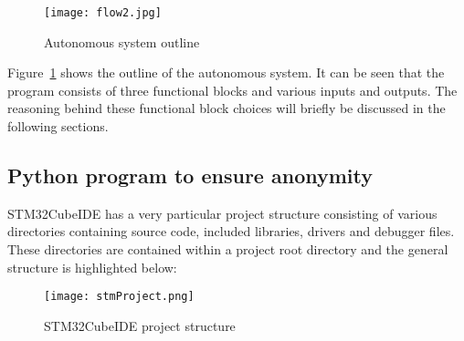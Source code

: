 \begin{figure}[H]
\begin{center}
\texttt{[image: flow2.jpg]}
\caption{Autonomous system outline}
\label{aso}
\end{center}
\end{figure}

Figure~\ref{aso} shows the outline of the autonomous system. It can be seen that the program consists of three functional blocks and various inputs and outputs. The reasoning behind these functional block choices will briefly be discussed in the following sections. 


\subsection{Python program to ensure anonymity}
\label{p1}

STM32CubeIDE has a very particular project structure consisting of various directories containing source code, included libraries, drivers and debugger files. These directories are contained within a project root directory and the general structure is highlighted below:

\begin{figure}[H]
\begin{center}
\texttt{[image: stmProject.png]}
\caption{STM32CubeIDE project structure}
\label{stmProj}
\end{center}
\end{figure}

